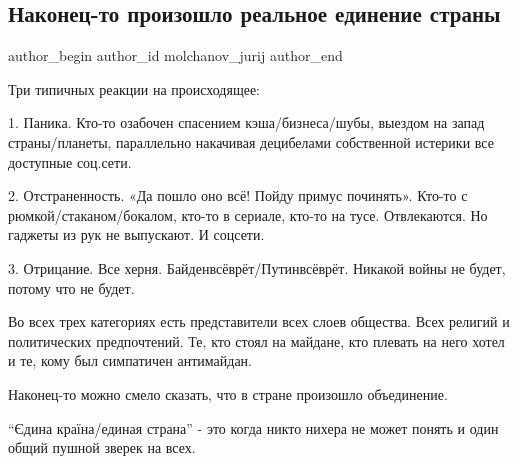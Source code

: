  
 
 
 
 
 
\subsection{Наконец-то произошло реальное единение страны}
\label{sec:13_02_2022.fb.molchanov_jurij.1.jedinenie}
 
\ifcmt
 author_begin
   author_id molchanov_jurij
 author_end
\fi

Три типичных реакции на происходящее:

1. Паника. Кто-то озабочен спасением кэша/бизнеса/шубы, выездом на запад
страны/планеты, параллельно накачивая децибелами собственной истерики все
доступные соц.сети.

2. Отстраненность. «Да пошло оно всё! Пойду примус починять». Кто-то с
рюмкой/стаканом/бокалом, кто-то в сериале, кто-то на тусе. Отвлекаются. Но
гаджеты из рук не выпускают. И соцсети.

3. Отрицание. Все херня. Байденвсёврёт/Путинвсёврёт. Никакой войны не будет,
потому что не будет.

Во всех трех категориях есть представители всех слоев общества. Всех религий и
политических предпочтений. Те, кто стоял на майдане, кто плевать на него хотел
и те, кому был симпатичен антимайдан.

Наконец-то можно смело сказать, что в стране произошло объединение. 

\enquote{Єдина країна/единая страна} - это когда никто нихера не может понять и
один общий пушной зверек на всех.
